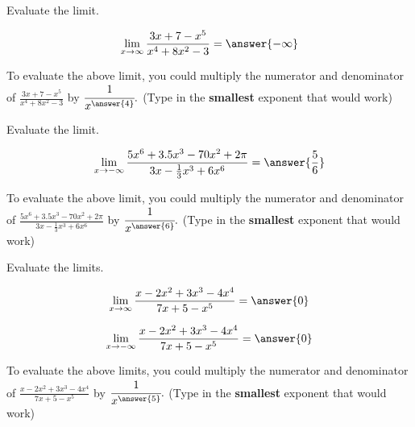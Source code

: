 \documentclass[handout]{ximera}
\begin{document}
\begin{exercise}

Evaluate the limit. 

\[ \displaystyle\lim_{x \to \infty} \frac{3x +7 - x^5}{x^4 + 8x^2 -3} = \answer{-\infty} \]

\begin{exercise}

To evaluate the above limit, you could multiply the numerator and denominator of $\frac{3x +7 - x^5}{x^4 + 8x^2 -3}$ by $\cfrac{1}{x^{\answer{4}}}.$  (Type in the \textbf{smallest} exponent that would work)

\end{exercise}

\end{exercise}

\begin{exercise}

Evaluate the limit. 

\[ \displaystyle\lim_{x \to -\infty} \frac{5x^6 + 3.5x^3 -70x^2 + 2\pi}{3x - \frac{1}{3}x^3+ 6x^6} = \answer{\frac{5}{6}} \]

\begin{exercise}

To evaluate the above limit, you could multiply the numerator and denominator of $\frac{5x^6 + 3.5x^3 -70x^2 + 2\pi}{3x - \frac{1}{3}x^3+ 6x^6}$ by $\cfrac{1}{x^{\answer{6}}}.$ (Type in the \textbf{smallest} exponent that would work)

\end{exercise}

\end{exercise}

\begin{exercise}

Evaluate the limits. 

\[ \displaystyle\lim_{x \to \infty} \frac{x - 2x^2 + 3x^3 -4x^4}{7x+5-x^5} = \answer{0} \]

\[ \displaystyle\lim_{x \to -\infty} \frac{x - 2x^2 + 3x^3 -4x^4}{7x+5-x^5} = \answer{0} \]

\begin{exercise}

To evaluate the above limits, you could multiply the numerator and denominator of $\frac{x - 2x^2 + 3x^3 -4x^4}{7x+5-x^5}$ by $\cfrac{1}{x^{\answer{5}}}.$ (Type in the \textbf{smallest} exponent that would work)

\end{exercise}

\end{exercise}
\end{document}
